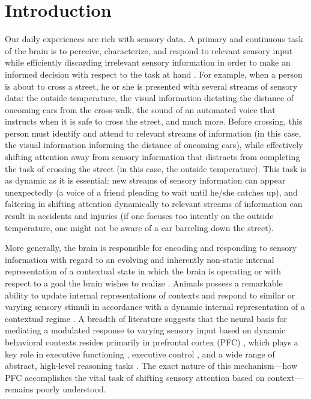 \documentclass[12pt,a4paper,final]{iopart}
\begin{document}
\section{Introduction}
\label{sec:intro}
Our daily experiences are rich with sensory data. A primary and continuous task of the brain is to perceive, characterize, and respond to relevant sensory input while efficiently discarding irrelevant sensory information in order to make an informed decision with respect to the task at hand \cite{JDCohen:2001, Noudoost:2010}. For example, when a person is about to cross a street, he or she is presented with several streams of sensory data: the outside temperature, the visual information dictating the distance of oncoming cars from the cross-walk, the sound of an automated voice that instructs when it is safe to cross the street, and much more. Before crossing, this person must identify and attend to relevant streams of information (in this case, the visual information informing the distance of oncoming cars), while effectively shifting attention away from sensory information that distracts from completing the task of crossing the street (in this case, the outside temperature). This task is as dynamic as it is essential: new streams of sensory information can appear unexpectedly (a voice of a friend pleading to wait until he/she catches up), and faltering in shifting attention dynamically to relevant streams of information can result in accidents and injuries (if one focuses too intently on the outside temperature, one might not be aware of a car barreling down the street).

More generally, the brain is responsible for encoding and responding to sensory information with regard to an evolving and inherently non-static internal representation of a contextual state in which the brain is operating or with respect to a goal the brain wishes to realize \cite{Desimon, JDCohen:2001}. Animals possess a remarkable ability to update internal representations of contexts and respond to similar or varying sensory stimuli in accordance with a dynamic internal representation of a contextual regime \cite{Desimon}. A breadth of literature suggests that the neural basis for mediating a modulated response to varying sensory input based on dynamic behavioral contexts resides primarily in prefrontal cortex (PFC) \cite{JDCohen:2001, Harvey, Desimon, Noudoost:2010, Tanji}, which plays a key role in executive functioning \cite{JDCohen:2001}, executive control \cite{Rossi}, and a wide range of abstract, high-level reasoning tasks \cite{Desimon, Tanji, Drewe, Fletcher}. The exact nature of this mechanism—how PFC accomplishes the vital task of shifting sensory attention based on context—remains poorly understood.
\end{document}
